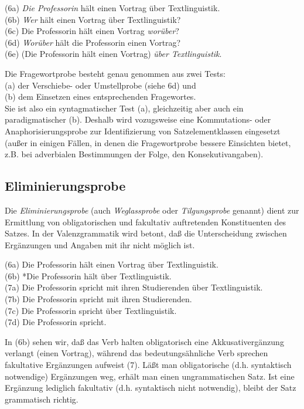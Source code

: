 \documentclass[
  letterpaper,
  DIV=11,
  numbers=noendperiod]{scrreprt}
\begin{document}
(6a) \emph{Die Professorin} hält einen Vortrag über Textlinguistik.\\
(6b) \emph{Wer} hält einen Vortrag über Textlinguistik?\\
(6c) Die Professorin hält einen Vortrag \emph{worüber}?\\
(6d) \emph{Worüber} hält die Professorin einen Vortrag?\\
(6e) (Die Professorin hält einen Vortrag) \emph{über Textlinguistik}.

Die Fragewortprobe besteht genau genommen aus zwei Tests:\\
(a) der Verschiebe- oder Umstellprobe (siehe 6d) und\\
(b) dem Einsetzen eines entsprechenden Fragewortes.\\
Sie ist also ein syntagmatischer Test (a), gleichzeitig aber auch ein
paradigmatischer (b). Deshalb wird vozugsweise eine Kommutations- oder
Anaphorisierungsprobe zur Identifizierung von Satzelementklassen
eingesetzt (außer in einigen Fällen, in denen die Fragewortprobe bessere
Einsichten bietet, z.B. bei adverbialen Bestimmungen der Folge, den
Konsekutivangaben).

\hypertarget{eliminierungsprobe}{%
\subsection{Eliminierungsprobe}\label{eliminierungsprobe}}

Die \emph{Eliminierungsprobe} (auch \emph{Weglassprobe} oder
\emph{Tilgungsprobe} genannt) dient zur Ermittlung von obligatorischen
und fakultativ auftretenden Konstituenten des Satzes. In der
Valenzgrammatik wird betont, daß die Unterscheidung zwischen Ergänzungen
und Angaben mit ihr nicht möglich ist.

(6a) Die Professorin hält einen Vortrag über Textlinguistik.\\
(6b) *Die Professorin hält über Textlinguistik.\\
(7a) Die Professorin spricht mit ihren Studierenden über
Textlinguistik.\\
(7b) Die Professorin spricht mit ihren Studierenden.\\
(7c) Die Professorin spricht über Textlinguistik.\\
(7d) Die Professorin spricht.

In (6b) sehen wir, daß das Verb halten obligatorisch eine
Akkusativergänzung verlangt (einen Vortrag), während das
bedeutungsähnliche Verb sprechen fakultative Ergänzungen aufweist (7).
Läßt man obligatorische (d.h. syntaktisch notwendige) Ergänzungen weg,
erhält man einen ungrammatischen Satz. Ist eine Ergänzung lediglich
fakultativ (d.h. syntaktisch nicht notwendig), bleibt der Satz
grammatisch richtig.
\end{document}
